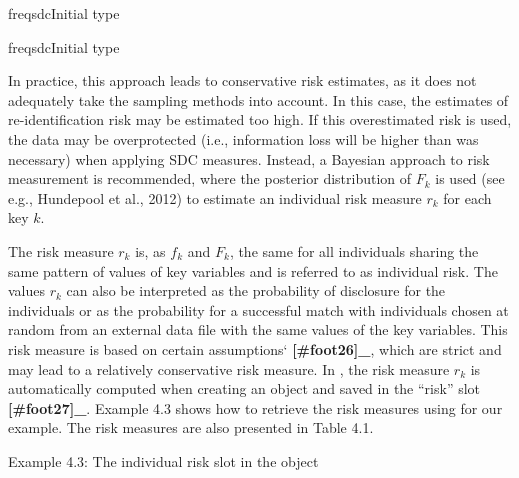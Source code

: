 \documentclass[letterpaper,10pt,english]{sphinxmanual}
\begin{document}
%
\begin{sphinxVerbatim}[commandchars=\\\{\}]
freqsdcInitial type  
         

freqsdcInitial type  
         
\end{sphinxVerbatim}

In practice, this approach leads to conservative risk estimates, as it
does not adequately take the sampling methods into account. In this
case, the estimates of re-identification risk may be estimated too high.
If this overestimated risk is used, the data may be overprotected (i.e.,
information loss will be higher than was necessary) when applying SDC
measures. Instead, a Bayesian approach to risk measurement is
recommended, where the posterior distribution of \(F_{k}\) is used
(see e.g., Hundepool et al., 2012) to estimate an individual risk
measure \(r_{k}\) for each key \(k\).

The risk measure \(r_{k}\) is, as \(f_{k}\) and \(F_{k}\),
the same for all individuals sharing the same pattern of values of key
variables and is referred to as individual risk. The values
\(r_{k}\) can also be interpreted as the probability of disclosure
for the individuals or as the probability for a successful match with
individuals chosen at random from an external data file with the same
values of the key variables. This risk measure is based on certain
assumptions{}` {\color{red}\bfseries{}{[}\#foot26{]}\_}, which are strict and may lead to a
relatively conservative risk measure. In , the risk measure
\(r_{k}\) is automatically computed when creating an 
object and saved in the “risk” slot {\color{red}\bfseries{}{[}\#foot27{]}\_}. Example 4.3
shows how to retrieve the risk measures using  for our
example. The risk measures are also presented in Table 4.1.

Example 4.3: The individual risk slot in the  object
\end{document}
